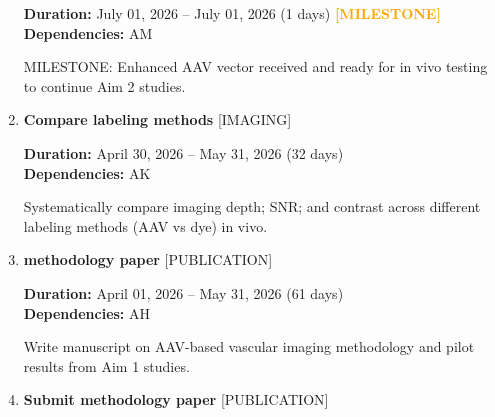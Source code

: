 \documentclass[landscape,a4paper]{article}
\begin{document}
\begin{enumerate}[leftmargin=1.5cm, itemsep=1em, parsep=0.5em]
          \vspace{0.2em}
          \textcolor{black!70}{\textbf{Duration:} July 01, 2026 -- July 01, 2026 (1 days)}
          \textcolor{orange}{\textbf{ [MILESTONE]}}\n          \\[0.2em]\textcolor{black!70}{\textbf{Dependencies:} AM}\n
          \vspace{0.4em}
          \begin{minipage}[t]{0.9\textwidth}
          \textcolor{black!85}{MILESTONE: Enhanced AAV vector received and ready for in vivo testing to continue Aim 2 studies.}
          \end{minipage}

    \item \textcolor{other}{\textbf{\large Compare labeling methods}}
          \hfill \textcolor{black!60}{\small [IMAGING]}
          
          \vspace{0.2em}
          \textcolor{black!70}{\textbf{Duration:} April 30, 2026 -- May 31, 2026 (32 days)}
          \\[0.2em]\textcolor{black!70}{\textbf{Dependencies:} AK}\n
          \vspace{0.4em}
          \begin{minipage}[t]{0.9\textwidth}
          \textcolor{black!85}{Systematically compare imaging depth; SNR; and contrast across different labeling methods (AAV vs dye) in vivo.}
          \end{minipage}

    \item \textcolor{researchout}{\textbf{\large methodology paper}}
          \hfill \textcolor{black!60}{\small [PUBLICATION]}
          
          \vspace{0.2em}
          \textcolor{black!70}{\textbf{Duration:} April 01, 2026 -- May 31, 2026 (61 days)}
          \\[0.2em]\textcolor{black!70}{\textbf{Dependencies:} AH}\n
          \vspace{0.4em}
          \begin{minipage}[t]{0.9\textwidth}
          \textcolor{black!85}{Write manuscript on AAV-based vascular imaging methodology and pilot results from Aim 1 studies.}
          \end{minipage}

    \item \textcolor{researchout}{\textbf{\large Submit methodology paper}}
          \hfill \textcolor{black!60}{\small [PUBLICATION]}
          

\end{enumerate}
\end{document}
